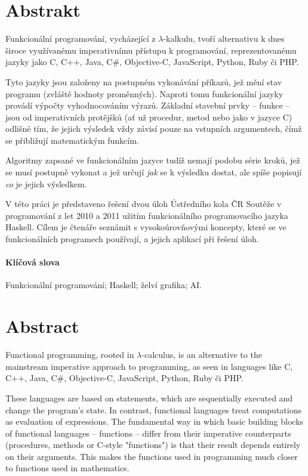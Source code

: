 \begin{adjustwidth}{1.5cm}{1.5cm}

\section*{Abstrakt}

Funkcionální programování, vycházející z $\lambda$-kalkulu, tvoří alternativu k
dnes široce využívanému imperativnímu přístupu k programování, reprezentovanému
jazyky jako C, C++, Java, C\#, Objective-C, JavaScript, Python, Ruby či PHP.

Tyto jazyky jsou založeny na postupném vykonávání příkazů, jež mění stav
programu (zvláště hodnoty proměnných). Naproti tomu funkcionální jazyky provádí
výpočty vyhodnocováním výrazů. Základní stavební prvky -- funkce -- jsou od
imperativních protějšků (ať už procedur, metod nebo  jako v jazyce C)
odlišné tím, že jejich výsledek vždy závisí pouze na vstupních argumentech, čímž
se přibližují matematickým funkcím.

Algoritmy zapsané ve funkcionálním jazyce tudíž nemají podobu série kroků, jež
se musí postupně vykonat a jež určují \emph{jak} se k výsledku dostat, ale spíše
popisují \emph{co} je jejich výsledkem.

V této práci je představeno řešení dvou úloh Ústředního kola ČR Soutěže v
programování z let 2010 a 2011 užitím funkcionálního programovacího jazyka
Haskell. Cílem je čtenáře seznámit s vysokoúrovňovými koncepty, které se ve
funkcionálních programech používají, a jejich aplikací při řešení
 úloh.

\paragraph*{Klíčová slova}
Funkcionální programování; Haskell; želví grafika; AI.

\section*{Abstract}

Functional programming, rooted in $\lambda$-calculus, is an alternative to the
mainstream imperative approach to programming, as seen in languages like C, C++,
Java, C\#, Objective-C, JavaScript, Python, Ruby či PHP.

These languages are based on statements, which are sequentially executed and
change the program's state. In contrast, functional languages treat computations
as evaluation of expressions. The fundamental way in which basic building blocks of
functional languages -- functions -- differ from their imperative counterparts
(procedures, methods or C-style "functions") is that their result depends
entirely on their arguments. This makes the functions used in programming much
closer to functions used in mathematics.


\end{adjustwidth}
